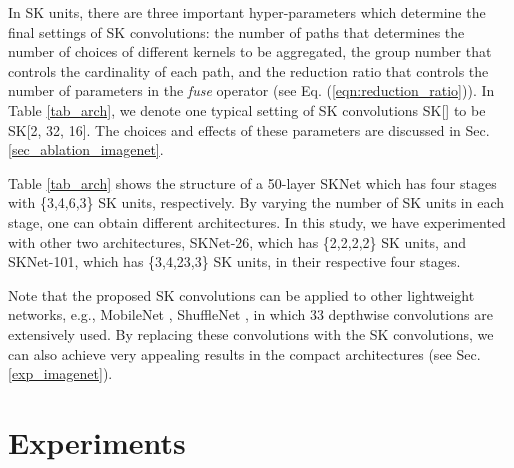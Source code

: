\documentclass[10pt,twocolumn,letterpaper]{article}
\begin{document}
	In SK units, there are three important hyper-parameters which determine the final settings of SK convolutions:  the number of paths  that determines the number of choices of different kernels to be aggregated, the group number  that controls the cardinality of each path, and the reduction ratio  that controls the number of parameters in the {\it fuse} operator (see Eq. (\ref{eqn:reduction_ratio})). In Table \ref{tab_arch}, we denote one typical setting of SK convolutions SK[] to be SK[2, 32, 16]. The choices and effects of these parameters are discussed in Sec. \ref{sec_ablation_imagenet}.
	
	{Table \ref{tab_arch} shows the structure of a 50-layer SKNet which has four stages with \{3,4,6,3\} SK units, respectively. By varying the number of SK units in each stage, one can obtain different architectures. In this study, we have experimented with other two architectures, SKNet-26, which has \{2,2,2,2\} SK units, and SKNet-101, which has \{3,4,23,3\} SK units, in their respective four stages.}
	
	Note that the proposed SK convolutions can be applied to other lightweight networks, e.g., MobileNet \cite{howard2017mobilenets,sandler2018mobilenetv2}, ShuffleNet \cite{zhang1707shufflenet,ma2018shufflenet}, in which 33 depthwise convolutions are extensively used. By replacing these convolutions with the SK convolutions, we can also achieve very appealing results in the compact architectures (see Sec. \ref{exp_imagenet}).
	
	
	\section{Experiments}
\end{document}
